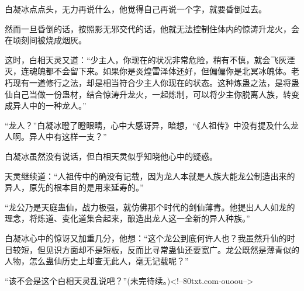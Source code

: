 \begin{this_body}
白凝冰点点头，无力再说什么，他觉得自己再说一个字，就要昏倒过去。

然而一旦昏倒的话，按照影无邪交代的话，他就无法控制住体内的惊涛升龙火，会在顷刻间被烧成烟灰。

这时，白相天灵又道：“少主人，你现在的状况非常危险，稍有不慎，就会飞灰湮灭，连魂魄都不会留下来。如果你是炎煌雷泽体还好，但偏偏你是北冥冰魄体。老朽现有一道修行之法，却是相当符合少主人你现在的状态。这种炼蛊之法，是将蛊仙自己当做一份蛊材，结合惊涛升龙火，一起炼制，可以将少主你脱离人族，转变成异人中的一种龙人。”

“龙人？”白凝冰瞪了瞪眼睛，心中大感讶异，暗想，“《人祖传》中没有提及什么龙人啊。异人中有这样一支？”

白凝冰虽然没有说话，但白相天灵似乎知晓他心中的疑惑。

天灵继续道：“人祖传中的确没有记载，因为龙人本就是人族大能龙公制造出来的异人，原先的根本目的是用来延寿的。”

“龙公乃是天庭蛊仙，战力极强，就仿佛那个时代的剑仙薄青。他提出人人如龙的理念，将炼道、变化道集合起来，酿造出龙人这一全新的异人种族。”

白凝冰心中的惊讶又加重几分，他想：“这个龙公到底何许人也？我虽然升仙的时日较短，但见识方面却不是短板，反而比寻常蛊仙还要宽广。龙公既然是薄青似的人物，怎么蛊仙历史上却查无此人，毫无记载呢？”

“该不会是这个白相天灵乱说吧？”(未完待续。)<!--80txt.com-ouoou-->

\end{this_body}

